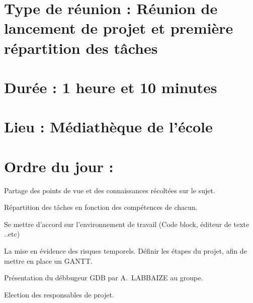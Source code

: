 \documentclass[11pt]{meetingmins}
\begin{document}
\maketitle
\section{Type de réunion : \textnormal{Réunion de lancement de projet et première répartition des tâches} }

\section{Durée : \textnormal{1 heure et 10 minutes} }
\section{Lieu : \textnormal{Médiathèque de l'école} }


\section{}
\section{Ordre du jour :}
\begin{hiddenitems}
\item
Partage des points de vue et des connaissances récoltées sur le sujet.
\item
Répartition des tâches en fonction des compétences de chacun.
\item
Se mettre d'accord sur l'environnement de travail (Code block, éditeur de texte ..etc)
\item
La mise en évidence des risques temporels. Définir les étapes du projet, afin de mettre en place un GANTT.
\item
Présentation du débbugeur GDB par A.~LABBAIZE au groupe.
\item
Election des responsables de projet.
\end{hiddenitems}
\end{document}
